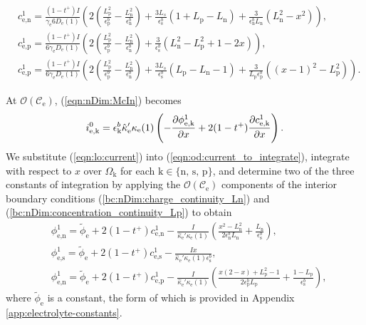 \documentclass[a4paper]{article}
\newcommand{\ts}[1]{_{\text{#1}}}
\newcommand{\kin}[1]{\text{k} \in \{\text{#1}\}}
\begin{document}
\begin{subequations}
\begin{align}
	&c\ts{e,n}^1 = \frac{(1-t^+) I}{\gamma\ts{e} 6 D\ts{e}(1)}
        \left( 2\left(\frac{L\ts{p}^2}{\epsilon\ts{p}^b} - \frac{L\ts{n}^2}{\epsilon\ts{n}^b}\right)
         +\frac{3L_{s}}{\epsilon\ts{s}^b}(1+L\ts{p}-L\ts{n}) + \frac{3}{\epsilon\ts{n}^b L\ts{n}}(L\ts{n}^2-x^2)
         \right), \\ 
	&c\ts{e,p}^1 = \frac{(1-t^+) I}{ 6\gamma\ts{e} D\ts{e}(1)}
        \left( 2\left(\frac{L\ts{p}^2}{\epsilon\ts{p}^b} - \frac{L\ts{n}^2}{\epsilon\ts{n}^b}\right)
         +\frac{3}{\epsilon\ts{s}^b}(L\ts{n}^2 - L\ts{p}^2 + 1-2x)
         \right), \\
	&c\ts{e,p}^1 = \frac{(1-t^+) I}{ 6 \gamma\ts{e} D\ts{e}(1)}
        \left( 2\left(\frac{L\ts{p}^2}{\epsilon\ts{p}^b} - \frac{L\ts{n}^2}{\epsilon\ts{n}^b}\right)
         +\frac{3L_{s}}{\epsilon\ts{s}^b}(L\ts{p} - L\ts{n} - 1) + \frac{3}{L\ts{p} \epsilon\ts{p}^b}( (x-1)^2 - L\ts{p}^2 )
         \right).
\end{align}
\end{subequations}

At $\mathcal{O}(\mathcal{C}\ts{e})$, (\ref{eqn:nDim:McIn}) becomes
\begin{gather}\label{eqn:od:current_to_integrate}
  i\ts{e,k}^0 = \epsilon\ts{k}^b \hat{\kappa}\ts{e}' \kappa\ts{e}(1) \left( -\pdv{\phi\ts{e,k}^1}{x} + 2(1-t^+)\pdv{c\ts{e,k}^1}{x} \right).
\end{gather} 
We substitute (\ref{eqn:lo:current}) into (\ref{eqn:od:current_to_integrate}), integrate with respect to $x$ over $\Omega\ts{k}$ for each $\kin{n, s, p}$, and determine two of the three constants of integration by applying the $\mathcal{O}(\mathcal{C}\ts{e})$ components of the interior boundary conditions (\ref{bc:nDim:charge_continuity_Ln}) and (\ref{bc:nDim:concentration_continuity_Lp}) to obtain
\begin{subequations}\label{eqn:second-order-phi} 
    \begin{align}
		&\phi\ts{e,n}^1 = \tilde{\phi}\ts{e} + 2(1-t^+)c\ts{e,n}^1
		- \frac{ I}{\hat{\kappa}\ts{e}' \kappa\ts{e}(1)}\left(\frac{x^2-L\ts{n}^2}{2 \epsilon\ts{n}^b L\ts{n}} + \frac{L\ts{n}}{\epsilon\ts{s}^b} \right), \\
		&\phi\ts{e,s}^1 = \tilde{\phi}\ts{e}  + 2(1-t^+)c\ts{e,s}^1
		- \frac{ I x}{\hat{\kappa}\ts{e}' \kappa\ts{e}(1)\epsilon\ts{s}^b},\\
		&\phi\ts{e,n}^1 = \tilde{\phi}\ts{e} + 2(1-t^+)c\ts{e,p}^1
		- \frac{I}{\hat{\kappa}\ts{e}' \kappa\ts{e}(1)}\left(\frac{x(2-x)+L\ts{p}^2-1}{2\epsilon\ts{p}^b L\ts{p}} + \frac{1-L\ts{p}}{\epsilon\ts{s}^b} \right),
    \end{align}
\end{subequations} 
where $\tilde{\phi}\ts{e}$ is a constant, the form of which is provided in Appendix \ref{app:electrolyte-constants}. 
\end{document}
